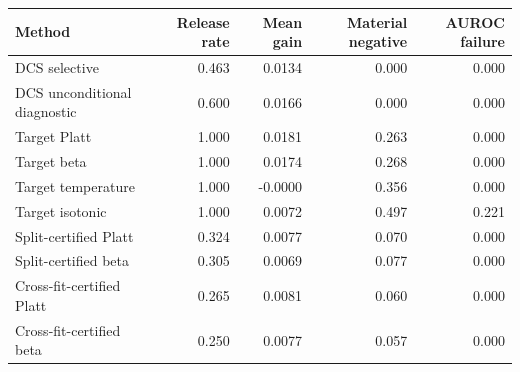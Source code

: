 \begin{tabular}{lrrrr}
\toprule
Method & Release rate & Mean gain & Material negative & AUROC failure \\
\midrule
DCS selective & 0.463 & 0.0134 & 0.000 & 0.000 \\
DCS unconditional diagnostic & 0.600 & 0.0166 & 0.000 & 0.000 \\
Target Platt & 1.000 & 0.0181 & 0.263 & 0.000 \\
Target beta & 1.000 & 0.0174 & 0.268 & 0.000 \\
Target temperature & 1.000 & -0.0000 & 0.356 & 0.000 \\
Target isotonic & 1.000 & 0.0072 & 0.497 & 0.221 \\
Split-certified Platt & 0.324 & 0.0077 & 0.070 & 0.000 \\
Split-certified beta & 0.305 & 0.0069 & 0.077 & 0.000 \\
Cross-fit-certified Platt & 0.265 & 0.0081 & 0.060 & 0.000 \\
Cross-fit-certified beta & 0.250 & 0.0077 & 0.057 & 0.000 \\
\bottomrule
\end{tabular}

